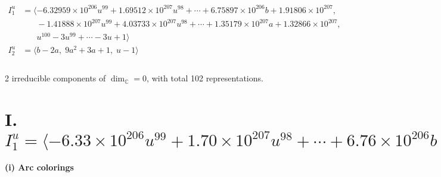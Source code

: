 \documentclass[1p]{elsarticle_modified}
\theoremstyle{definition}
\begin{document}
\begin{align*}
I^u_{1}&=\langle 
-6.32959\times10^{206} u^{99}+1.69512\times10^{207} u^{98}+\cdots+6.75897\times10^{206} b+1.91806\times10^{207},\\
\phantom{I^u_{1}}&\phantom{= \langle  }-1.41888\times10^{207} u^{99}+4.03733\times10^{207} u^{98}+\cdots+1.35179\times10^{207} a+1.32866\times10^{207},\\
\phantom{I^u_{1}}&\phantom{= \langle  }u^{100}-3 u^{99}+\cdots-3 u+1\rangle \\
I^u_{2}&=\langle 
b-2 a,\;9 a^2+3 a+1,\;u-1\rangle \\
\\
\end{align*}
\raggedright * 2 irreducible components of $\dim_{\mathbb{C}}=0$, with total 102 representations.\\
\newpage
\renewcommand{\arraystretch}{1}
\centering \section*{I. $I^u_{1}= \langle -6.33\times10^{206} u^{99}+1.70\times10^{207} u^{98}+\cdots+6.76\times10^{206} b+1.92\times10^{207},\;-1.42\times10^{207} u^{99}+4.04\times10^{207} u^{98}+\cdots+1.35\times10^{207} a+1.33\times10^{207},\;u^{100}-3 u^{99}+\cdots-3 u+1 \rangle$}
\flushleft \textbf{(i) Arc colorings}\\
\end{document}
